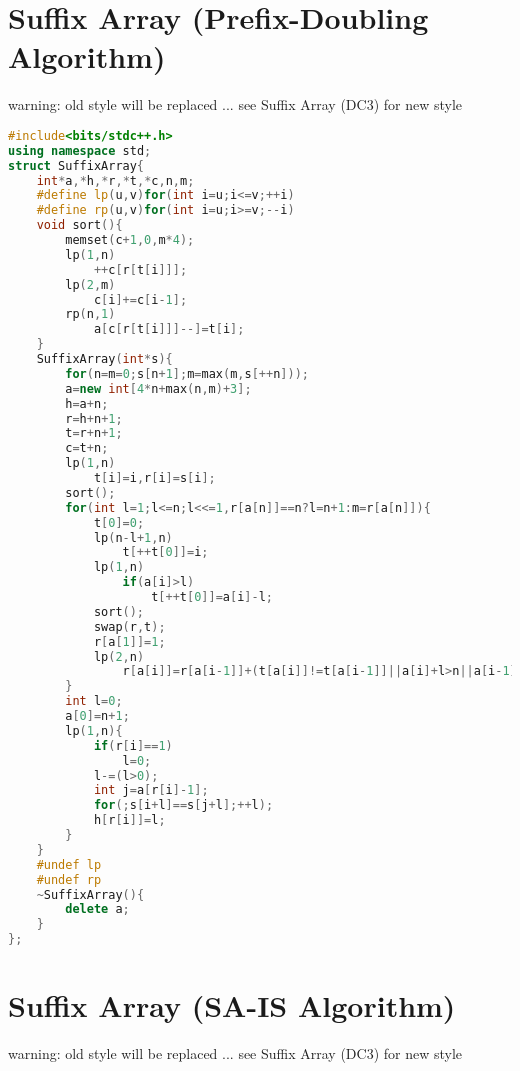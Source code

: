\documentclass{book}
\begin{document}
\section{Suffix Array (Prefix-Doubling Algorithm)}
warning: old style will be replaced ... see Suffix Array (DC3) for new style\begin{lstlisting}[language=C++,title={Suffix Array (Prefix-Doubling Algorithm).hpp (1357 bytes, 55 lines)}]
#include<bits/stdc++.h>
using namespace std;
struct SuffixArray{
    int*a,*h,*r,*t,*c,n,m;
    #define lp(u,v)for(int i=u;i<=v;++i)
    #define rp(u,v)for(int i=u;i>=v;--i)
    void sort(){
        memset(c+1,0,m*4);
        lp(1,n)
            ++c[r[t[i]]];
        lp(2,m)
            c[i]+=c[i-1];
        rp(n,1)
            a[c[r[t[i]]]--]=t[i];
    }
    SuffixArray(int*s){
        for(n=m=0;s[n+1];m=max(m,s[++n]));
        a=new int[4*n+max(n,m)+3];
        h=a+n;
        r=h+n+1;
        t=r+n+1;
        c=t+n;
        lp(1,n)
            t[i]=i,r[i]=s[i];
        sort();
        for(int l=1;l<=n;l<<=1,r[a[n]]==n?l=n+1:m=r[a[n]]){
            t[0]=0;
            lp(n-l+1,n)
                t[++t[0]]=i;
            lp(1,n)
                if(a[i]>l)
                    t[++t[0]]=a[i]-l;
            sort();
            swap(r,t);
            r[a[1]]=1;
            lp(2,n)
                r[a[i]]=r[a[i-1]]+(t[a[i]]!=t[a[i-1]]||a[i]+l>n||a[i-1]+l>n||t[a[i]+l]!=t[a[i-1]+l]);
        }
        int l=0;
        a[0]=n+1;
        lp(1,n){
            if(r[i]==1)
                l=0;
            l-=(l>0);
            int j=a[r[i]-1];
            for(;s[i+l]==s[j+l];++l);
            h[r[i]]=l;
        }
    }
    #undef lp
    #undef rp
    ~SuffixArray(){
        delete a;
    }
};
\end{lstlisting}
\section{Suffix Array (SA-IS Algorithm)}
warning: old style will be replaced ... see Suffix Array (DC3) for new style\begin{lstlisting}[language=C++,title={Suffix Array (SA-IS Algorithm).hpp (0 bytes, 0 lines)}]
\end{lstlisting}
\end{document}
